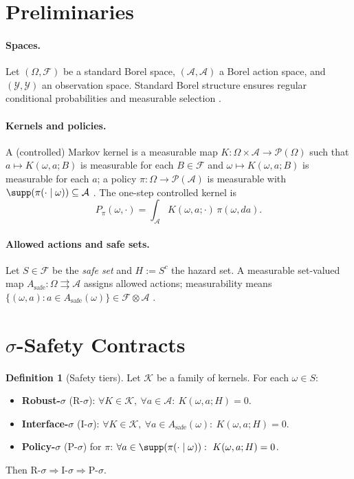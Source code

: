 \documentclass[11pt]{article}
\theoremstyle{plain}
\theoremstyle{definition}
\newtheorem{definition}[theorem]{Definition}
\theoremstyle{remark}
\newcommand{\1}{\mathbbm{1}}
\newcommand{\F}{\mathcal{F}}
\newcommand{\A}{\mathcal{A}}
\newcommand{\Y}{\mathcal{Y}}
\newcommand{\K}{\mathcal{K}}
\newcommand{\Pcal}{\mathcal{P}}
\begin{document}
\section{Preliminaries}
\paragraph{Spaces.}
Let \((\Omega,\F)\) be a standard Borel space, \((\A,\mathcal{A})\) a Borel action space, and \((\Y,\mathcal{Y})\) an observation space. Standard Borel structure ensures regular conditional probabilities and measurable selection \parencite[Chs.~7--9]{Bogachev2007,AliprantisBorder2006}.

\paragraph{Kernels and policies.}
A (controlled) Markov kernel is a measurable map \(K:\Omega\times \A\to \Pcal(\Omega)\) such that \(a\mapsto K(\omega,a;B)\) is measurable for each \(B\in\F\) and \(\omega\mapsto K(\omega,a;B)\) is measurable for each \(a\); a policy \(\pi:\Omega\to \Pcal(\A)\) is measurable with \(\supp(\pi(\cdot\mid \omega))\subseteq \A\) \parencite[Chs.~1--2]{MeynTweedie2009}. The one-step controlled kernel is
\[
P_\pi(\omega,\cdot)=\int_{\A}K(\omega,a;\cdot)\,\pi(\omega,da).
\]

\paragraph{Allowed actions and safe sets.}
Let \(S\in\F\) be the \emph{safe set} and \(H:=S^c\) the hazard set. A measurable set-valued map \(A_{\mathrm{safe}}:\Omega\rightrightarrows\A\) assigns allowed actions; measurability means \(\{(\omega,a):a\in A_{\mathrm{safe}}(\omega)\}\in \F\otimes\mathcal{A}\) \parencite{AliprantisBorder2006}.

\section{\texorpdfstring{$\sigma$}{sigma}-Safety Contracts}\label{sec:sigma}
\begin{definition}[Safety tiers]
Let \(\K\) be a family of kernels. For each \(\omega\in S\):
\begin{itemize}[leftmargin=1.3em]
\item \textbf{Robust-\(\sigma\)} (R-\(\sigma\)): \(\forall K\in\K,\ \forall a\in \A:\ K(\omega,a;H)=0\).
\item \textbf{Interface-\(\sigma\)} (I-\(\sigma\)): \(\forall K\in\K,\ \forall a\in A_{\mathrm{safe}}(\omega):\ K(\omega,a;H)=0\).
\item \textbf{Policy-\(\sigma\)} (P-\(\sigma\)) for \(\pi\): \(\forall a\in\supp(\pi(\cdot\mid \omega)):\ K(\omega,a;H)=0\).
\end{itemize}
Then \(\text{R-}\sigma\Rightarrow\text{I-}\sigma\Rightarrow\text{P-}\sigma\).
\end{definition}
\end{document}
